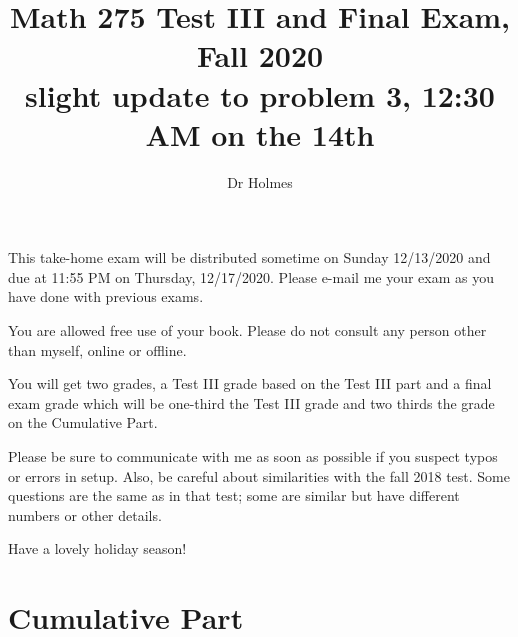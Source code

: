 \documentclass[12pt]{article}
\title{Math 275 Test III and Final Exam, Fall 2020 \\ slight update to problem 3, 12:30 AM on the 14th}
\author{Dr Holmes}
\begin{document}
\maketitle

This take-home exam will be distributed sometime on Sunday 12/13/2020 and due at 11:55 PM  on Thursday, 12/17/2020.  Please e-mail me your exam as you have done with previous exams.

You are allowed free use of your book.  Please do not consult any person other than myself, online or offline.

You will get two grades, a Test III grade based on the Test III part and a final exam grade which will be one-third the Test III grade and two thirds the grade on the Cumulative Part.

Please be sure to communicate with me as soon as possible if you suspect typos or errors in setup.  Also, be careful about similarities with the fall 2018 test.  Some questions are the same as in that test;  some are similar but have different numbers or other details.

Have a lovely holiday season!

\newpage

\section{Cumulative Part}
\end{document}
